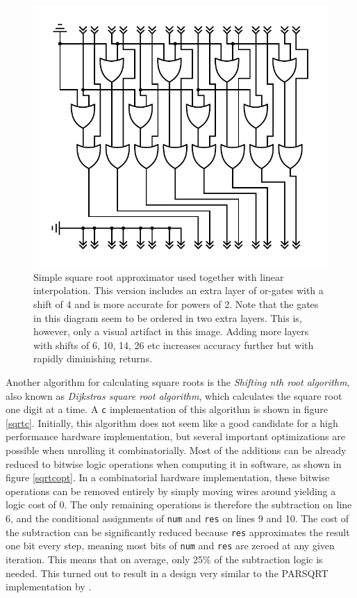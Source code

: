			\begin{figure}
				\centering
				\caption{ Simple square root approximator used together with
					linear interpolation. This version includes an extra layer
					of or-gates with a shift of 4 and is more accurate for
					powers of 2. Note that the gates in this diagram seem to be
					ordered in two extra layers. This is, however, only a
					visual artifact in this image. Adding more layers with
					shifts of 6, 10, 14, 26 etc increases accuracy further but 
					with rapidly diminishing returns.}
				\label{orsqrt3}
				\includegraphics[width=0.75\linewidth]{figure/pdf/sqrt2Or.pdf} 
			\end{figure}

			Another algorithm for calculating square roots is the
			\emph{Shifting nth root algorithm}, also known as \emph{Dijkstras
			square root algorithm}\cite{Li}, which calculates the square root one digit
			at a time. A \texttt{c} implementation of this algorithm is shown
			in figure \ref{sqrtc}. Initially, this algorithm does not seem like
			a good candidate for a high performance hardware implementation,
			but several important optimizations are possible when unrolling it
			combinatorially. Most of the additions can be already reduced to bitwise
			logic operations when computing it in software, as shown in
			figure \ref{sqrtcopt}. In a combinatorial hardware implementation,
			these bitwise operations can be removed entirely by simply moving
			wires around yielding a logic cost of 0. The only remaining
			operations is therefore the subtraction on line 6, and the
			conditional assignments of \texttt{num} and \texttt{res} on lines 9
			and 10. The cost of the subtraction can be significantly reduced
			because \texttt{res} approximates the result one bit every step,
			meaning most bits of \texttt{num} and \texttt{res} are zeroed at
			any given iteration. This means that on average, only 25\% of the
			subtraction logic is needed. This turned out to result in a design
			very similar to the PARSQRT implementation by \cite{Li}.

